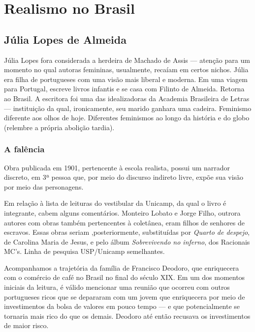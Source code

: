 
\chapter{Realismo no Brasil}

\section{Júlia Lopes de Almeida}

Júlia Lopes fora considerada a herdeira de Machado de Assis — atenção para um momento no qual autoras femininas, usualmente, recaíam em certos nichos.  Júlia era filha de portugueses com uma visão mais liberal e moderna. Em uma viagem para Portugal, escreve livros infantis e se casa com Filinto de Almeida. Retorna ao Brasil. A escritora foi uma das idealizadoras da Academia Brasileira de Letras — instituição da qual, ironicamente, seu marido ganhara uma cadeira. Feminismo diferente aos olhos de hoje. Diferentes feminismos  ao longo da história e do globo (relembre a própria abolição tardia).

\subsection{A falência}

Obra publicada em 1901, pertencente à escola realista, possui um narrador discreto, em 3ª pessoa que, por meio do discurso indireto livre, expõe sua visão por meio das personagens.

Em relação à lista de leituras do vestibular da Unicamp, da qual o livro é integrante, cabem alguns comentários. Monteiro Lobato e Jorge Filho, outrora autores com obras também pertencentes à coletânea, eram filhos de senhores de escravos. Essas obras seriam ,posteriormente, substituídas por \textit{Quarto de despejo}, de Carolina Maria de Jesus, e pelo álbum \textit{Sobrevivendo no inferno}, dos Racionais MC's. Linha de pesquisa USP/Unicamp semelhantes.

Acompanhamos a trajetória da família de Francisco Deodoro, que enriquecera com o comércio de café no Brasil no final do século XIX. Em um dos momentos iniciais da leitura, é válido mencionar uma reunião que ocorreu com outros portugueses ricos que se depararam com um jovem que enriquecera por meio de investimentos da bolsa de valores em pouco tempo — e que potencialmente se tornaria mais rico do que os demais. Deodoro até então recusava os investimentos de maior risco.

